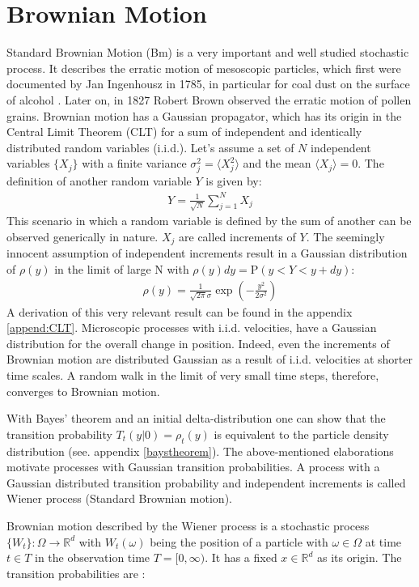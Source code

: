 \documentclass[
  a4paper,BCOR10mm,twoside,
  headsepline,footsepline,%
  fleqn,openbib
]{scrbook}
\begin{document}
\section{Brownian Motion}
Standard Brownian Motion (Bm) is a very important and well studied stochastic process. It describes the erratic motion of mesoscopic particles, which first were documented by Jan Ingenhousz in 1785, in particular for coal dust on the surface of alcohol \cite{Hofling2013}. Later on, in 1827 Robert Brown observed the erratic motion of pollen grains. Brownian motion has a Gaussian propagator, which has its origin in the Central Limit Theorem (CLT) for a sum of independent and identically distributed random variables (i.i.d.). Let's assume a set of $N$ independent variables $\{X_j\}$ with a finite variance $ \sigma_j^2=\langle X_{j}^2\rangle $ and the mean $\langle X_{j}\rangle = 0$. The definition of another random variable $Y$ is given by:
 \begin{align}
  Y = \frac{1}{\sqrt{N}} \sum_{j=1}^N X_j \label{eq:CLT}
 \end{align}
This scenario in which a random variable is defined by the sum of another can be observed generically in nature. $X_j$ are called increments of $Y$. The seemingly innocent assumption of independent increments result in a Gaussian distribution of $\rho(y)$ in the limit of large N with $\rho(y)dy=\mathrm{P}(y<Y<y+dy)$:
\begin{align}
 \rho(y) =\frac{1}{\sqrt{2 \pi} \sigma } \exp \left(-\frac{y^2}{2 \sigma^2}\right)
\end{align}
A derivation of this very relevant result can be found in the appendix \ref{append:CLT}. Microscopic processes with i.i.d. velocities, have a Gaussian distribution for the overall change in position. Indeed, even the increments of Brownian motion are distributed Gaussian as a result of i.i.d. velocities at shorter time scales. A random walk in the limit of very small time steps, therefore, converges to Brownian motion. \par With  Bayes' theorem and an initial delta-distribution one can show that the transition probability $T_{t}(y|0) = \rho_{t}(y)$ is equivalent to the particle density distribution (see. appendix \ref{baystheorem}). The above-mentioned elaborations motivate processes with Gaussian transition probabilities. A process with a Gaussian distributed transition probability and independent increments is called Wiener process (Standard Brownian motion).\par
Brownian motion described by the Wiener process is a stochastic process $ \{ W_t \}: \Omega \rightarrow \mathbb{R}^d$ with $ W_t(\omega)$ being the position of a particle with $\omega \in \Omega$ at time $t \in T$ in the observation time $T =[0, \infty)$. It has a fixed $x \in \mathbb{R}^d$ as its origin. The transition probabilities are \cite{LectureFelix}: 
\end{document}
